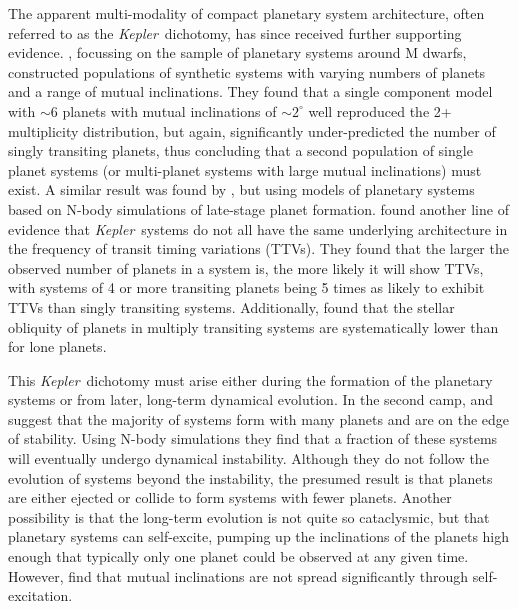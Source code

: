 \documentclass{emulateapj}
\def\kepler{{\slshape Kepler}}
\begin{document}
 The apparent multi-modality of compact planetary system architecture, often referred to as the \kepler\ dichotomy, has since received further supporting evidence. \citet{Ballard14}, focussing on the sample of planetary systems around M dwarfs, constructed populations of synthetic systems with varying numbers of planets and a range of mutual inclinations. They found that a single component model with $\sim$6 planets with mutual inclinations of $\sim2^{\circ}$ well reproduced the 2+ multiplicity distribution, but again, significantly under-predicted the number of singly transiting planets, thus concluding that a second population of single planet systems (or multi-planet systems with large mutual inclinations) must exist. A similar result was found by \citet{Hansen13}, but using models of planetary systems based on N-body simulations of late-stage planet formation. \citet{Xie14} found another line of evidence that \kepler\ systems do not all have the same underlying architecture in the frequency of transit timing variations (TTVs). They found that the larger the observed number of planets in a system is, the more likely it will show TTVs, with systems of 4 or more transiting planets being 5 times as likely to exhibit TTVs than singly transiting systems. Additionally, \citet{Morton14} found that the stellar obliquity of planets in multiply transiting systems are systematically lower than for lone planets.

 This \kepler\ dichotomy must arise either during the formation of the planetary systems or from later, long-term dynamical evolution. In the second camp, \citet{Pu15} and \citet{Volk15} suggest that the majority of systems form with many planets and are on the edge of stability. Using N-body simulations they find that a fraction of these systems will eventually undergo dynamical instability. Although they do not follow the evolution of systems beyond the instability, the presumed result is that planets are either ejected or collide to form systems with fewer planets. Another possibility is that the long-term evolution is not quite so cataclysmic, but that planetary systems can self-excite, pumping up the inclinations of the planets high enough that typically only one planet could be observed at any given time. However, \citet{Becker15} find that mutual inclinations are not spread significantly through self-excitation.
\end{document}
